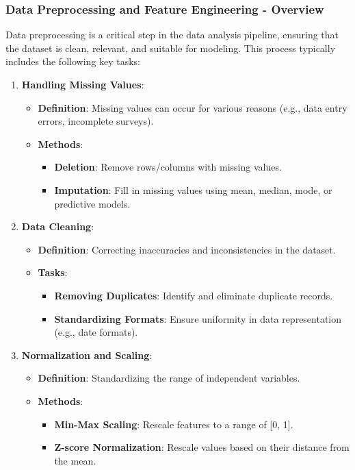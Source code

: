 \documentclass[aspectratio=169]{beamer}
\begin{document}
\begin{frame}[fragile]
    \frametitle{Data Preprocessing and Feature Engineering - Overview}
    Data preprocessing is a critical step in the data analysis pipeline, ensuring that the dataset is clean, relevant, and suitable for modeling. This process typically includes the following key tasks:
    
    \begin{enumerate}
        \item \textbf{Handling Missing Values}:
        \begin{itemize}
            \item \textbf{Definition}: Missing values can occur for various reasons (e.g., data entry errors, incomplete surveys).
            \item \textbf{Methods}: 
            \begin{itemize}
                \item \textbf{Deletion}: Remove rows/columns with missing values.
                \item \textbf{Imputation}: Fill in missing values using mean, median, mode, or predictive models.
            \end{itemize}
        \end{itemize}

        \item \textbf{Data Cleaning}:
        \begin{itemize}
            \item \textbf{Definition}: Correcting inaccuracies and inconsistencies in the dataset.
            \item \textbf{Tasks}:
            \begin{itemize}
                \item \textbf{Removing Duplicates}: Identify and eliminate duplicate records.
                \item \textbf{Standardizing Formats}: Ensure uniformity in data representation (e.g., date formats).
            \end{itemize}
        \end{itemize}

        \item \textbf{Normalization and Scaling}:
        \begin{itemize}
            \item \textbf{Definition}: Standardizing the range of independent variables.
            \item \textbf{Methods}:
            \begin{itemize}
                \item \textbf{Min-Max Scaling}: Rescale features to a range of [0, 1].
                \item \textbf{Z-score Normalization}: Rescale values based on their distance from the mean.
            \end{itemize}
        \end{itemize}
    \end{enumerate}
\end{frame}
\end{document}
